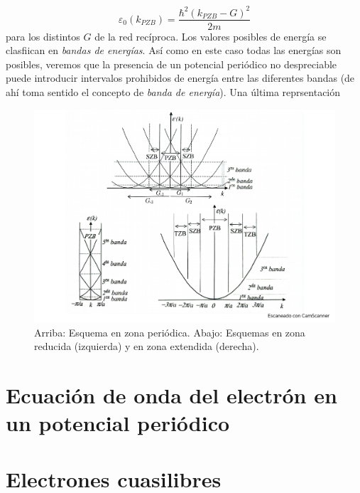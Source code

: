 \begin{equation}
    \varepsilon_0 (k_{PZB}) = \frac{\hbar^2 (k_{PZB}-G)^2}{2m}
\end{equation}
para los distintos $G$ de la red recíproca. Los valores posibles de energía se clasfiican en \textit{bandas de energías}. Así como en este caso todas las energías son posibles, veremos que la presencia de un potencial periódico no despreciable puede introducir intervalos prohibidos de energía entre las diferentes bandas (de ahí toma sentido el concepto de \textit{banda de energía}). Una última reprsentación

\begin{figure}[h!] \centering
    \includegraphics[scale=0.5]{Cuerpo/Ch_07/Fotos libro 1.pdf}
    \caption{Arriba: Esquema en zona periódica. Abajo: Esquemas en zona reducida (izquierda) y en zona extendida (derecha).}
    \label{Fig:07-01}
\end{figure}    



\section{Ecuación de onda del electrón en un potencial periódico}

\section{Electrones cuasilibres}

